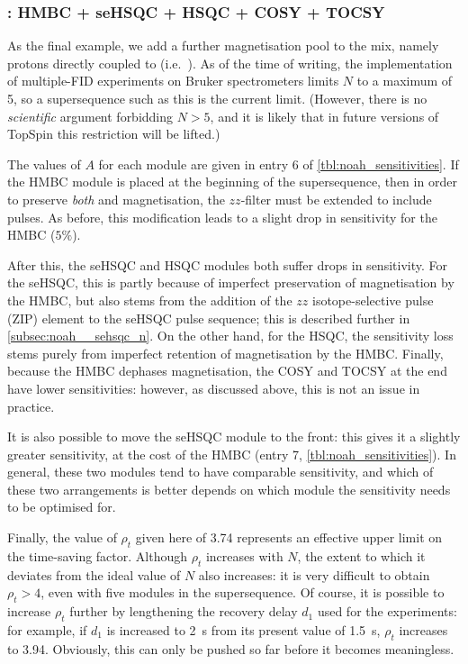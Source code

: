 \subsubsection{: HMBC + \nitrogen{} seHSQC + HSQC + COSY + TOCSY}

As the final example, we add a further magnetisation pool to the mix, namely protons directly coupled to \nitrogen{} (i.e.\ ).
As of the time of writing, the implementation of multiple-FID experiments on Bruker spectrometers limits $N$ to a maximum of 5, so a supersequence such as this  is the current limit.
(However, there is no \textit{scientific} argument forbidding $N > 5$, and it is likely that in future versions of TopSpin this restriction will be lifted.)

The values of $A$ for each module are given in entry 6 of \cref{tbl:noah_sensitivities}.
If the HMBC module is placed at the beginning of the supersequence, then in order to preserve \textit{both}  and  magnetisation, the $zz$-filter must be extended to include \nitrogen{} pulses\autocite{Kupce2019JMR}.
As before, this modification leads to a slight drop in sensitivity for the HMBC ($5\%$).

After this, the \nitrogen{} seHSQC and \carbon{} HSQC modules both suffer drops in sensitivity.
For the \nitrogen{} seHSQC, this is partly because of imperfect preservation of  magnetisation by the HMBC, but also stems from the addition of the $zz$ isotope-selective pulse (ZIP) element to the seHSQC pulse sequence; this is described further in \cref{subsec:noah__sehsqc_n}.
On the other hand, for the \carbon{} HSQC, the sensitivity loss stems purely from imperfect retention of  magnetisation by the HMBC.
Finally, because the HMBC dephases  magnetisation, the COSY and TOCSY at the end have lower sensitivities: however, as discussed above, this is not an issue in practice.

It is also possible to move the \nitrogen{} seHSQC module to the front: this gives it a slightly greater sensitivity, at the cost of the HMBC (entry 7, \cref{tbl:noah_sensitivities}).
In general, these two modules tend to have comparable sensitivity, and which of these two arrangements is better depends on which module the sensitivity needs to be optimised for.

Finally, the value of $\rho_t$ given here of 3.74 represents an effective upper limit on the time-saving factor.
Although $\rho_t$ increases with $N$, the extent to which it deviates from the ideal value of $N$ also increases: it is very difficult to obtain $\rho_t > 4$, even with five modules in the supersequence.
Of course, it is possible to increase $\rho_t$ further by lengthening the recovery delay $d_1$ used for the experiments: for example, if $d_1$ is increased to \qty{2}{\s} from its present value of \qty{1.5}{\s}, $\rho_t$ increases to 3.94.
Obviously, this can only be pushed so far before it becomes meaningless.

